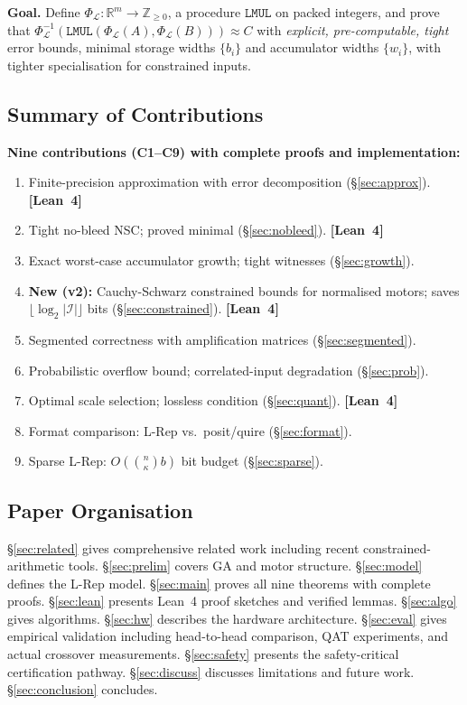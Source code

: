 \documentclass[11pt,a4paper]{article}
\theoremstyle{definition}
\theoremstyle{plain}
\theoremstyle{remark}
\newcommand{\Pack}{\Phi_{\mathcal{L}}}
\newcommand{\Unpack}{\Phi^{-1}_{\mathcal{L}}}
\newcommand{\reals}{\mathbb{R}}
\begin{document}
\begin{keyresult}
\textbf{Goal.}
Define $\Pack:\reals^m\to\mathbb{Z}_{\ge0}$, a procedure $\mathtt{LMUL}$
on packed integers, and prove that
$\Unpack(\mathtt{LMUL}(\Pack(A),\Pack(B)))\approx C$
with \emph{explicit, pre-computable, tight} error bounds,
minimal storage widths $\{b_i\}$ and accumulator widths $\{w_i\}$,
with tighter specialisation for constrained inputs.
\end{keyresult}

\subsection{Summary of Contributions}

\begin{contribution}
\textbf{Nine contributions (C1--C9) with complete proofs and implementation:}
\begin{enumerate}[label=C\arabic*.]
  \item Finite-precision approximation with error decomposition (\S\ref{sec:approx}). \textbf{[Lean~4]}
  \item Tight no-bleed NSC; proved minimal (\S\ref{sec:nobleed}). \textbf{[Lean~4]}
  \item Exact worst-case accumulator growth; tight witnesses (\S\ref{sec:growth}).
  \item \textbf{New (v2):} Cauchy-Schwarz constrained bounds for normalised motors;
        saves $\lfloor\log_2|\mathcal{I}|\rfloor$ bits (\S\ref{sec:constrained}). \textbf{[Lean~4]}
  \item Segmented correctness with amplification matrices (\S\ref{sec:segmented}).
  \item Probabilistic overflow bound; correlated-input degradation (\S\ref{sec:prob}).
  \item Optimal scale selection; lossless condition (\S\ref{sec:quant}). \textbf{[Lean~4]}
  \item Format comparison: L-Rep vs.\ posit/quire (\S\ref{sec:format}).
  \item Sparse L-Rep: $O\!\left(\binom{n}{\kappa}b\right)$ bit budget (\S\ref{sec:sparse}).
\end{enumerate}
\end{contribution}

\subsection{Paper Organisation}

\S\ref{sec:related} gives comprehensive related work including recent
constrained-arithmetic tools.
\S\ref{sec:prelim} covers GA and motor structure.
\S\ref{sec:model} defines the L-Rep model.
\S\ref{sec:main} proves all nine theorems with complete proofs.
\S\ref{sec:lean} presents Lean~4 proof sketches and verified lemmas.
\S\ref{sec:algo} gives algorithms.
\S\ref{sec:hw} describes the hardware architecture.
\S\ref{sec:eval} gives empirical validation including head-to-head comparison,
QAT experiments, and actual crossover measurements.
\S\ref{sec:safety} presents the safety-critical certification pathway.
\S\ref{sec:discuss} discusses limitations and future work.
\S\ref{sec:conclusion} concludes.
\end{document}
